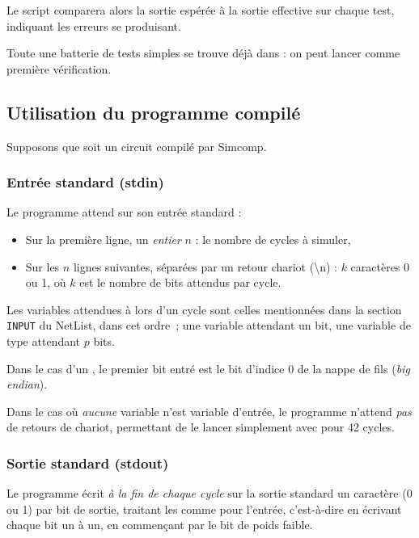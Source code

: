 \documentclass[11pt,a4paper]{article}
\begin{document}
Le script comparera alors la sortie espérée à la sortie effective sur chaque test, indiquant les erreurs se produisant.

Toute une batterie de tests simples se trouve déjà dans  : on peut lancer  comme première vérification.

\subsection{Utilisation du programme compilé} \label{sec:i/o}

Supposons que  soit un circuit compilé par Simcomp.

\subsubsection*{Entrée standard (stdin)}

Le programme attend sur son entrée standard :

\begin{itemize}
\item Sur la première ligne, un \emph{entier} $n$ : le nombre de cycles à simuler,
\item Sur les $n$ lignes suivantes, séparées par un retour chariot (\textbackslash n) : $k$ caractères 0 ou 1, où $k$ est le nombre de bits attendus par cycle.
\end{itemize}

Les variables attendues à lors d'un cycle sont celles mentionnées dans la section \lstinline`INPUT` du NetList, dans cet ordre~; une variable  attendant un bit, une variable de type  attendant $p$ bits.

Dans le cas d'un , le premier bit entré est le bit d'indice 0 de la nappe de fils (\emph{big endian}).

Dans le cas où \emph{aucune} variable n'est variable d'entrée, le programme n'attend \emph{pas} de retours de chariot, permettant de le lancer simplement avec  pour 42 cycles.

\subsubsection*{Sortie standard (stdout)}

Le programme écrit \emph{à la fin de chaque cycle} sur la sortie standard un caractère (0 ou 1) par bit de sortie, traitant les  comme pour l'entrée, c'est-à-dire en écrivant chaque bit un à un, en commençant par le bit de poids faible.
\end{document}

